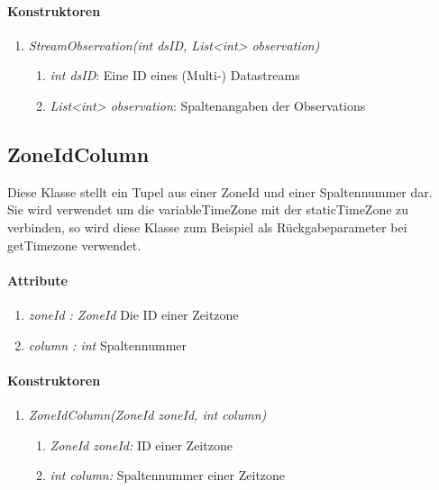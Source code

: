 \paragraph{Konstruktoren}
\begin{enumerate}[+]
	\item \textit{StreamObservation(int dsID, List<int> observation)} \\
	
	\begin{enumerate}[$\bullet$]
		\item \textit{int dsID}: Eine ID eines (Multi-) Datastreams
		\item \textit{List<int> observation}: Spaltenangaben der Observations 
	\end{enumerate}
\end{enumerate}






\subsection*{ZoneIdColumn}\label{zoneCol}
Diese Klasse stellt ein Tupel aus einer ZoneId und einer Spaltennummer dar.\\
Sie wird verwendet um die variableTimeZone mit der staticTimeZone zu verbinden, so wird diese Klasse zum Beispiel als Rückgabeparameter bei getTimezone verwendet.

\paragraph{Attribute}
\begin{enumerate}[-]
	\item \textit{zoneId : ZoneId} Die ID einer Zeitzone
	\item \textit{column : int} Spaltennummer
\end{enumerate}

\paragraph{Konstruktoren}
\begin{enumerate}[+]
	\item \textit{ZoneIdColumn(ZoneId zoneId, int column)} \\
	
	\begin{enumerate}[$\bullet$]
		\item \textit{ZoneId zoneId:} ID einer Zeitzone
		\item \textit{int column:} Spaltennummer einer Zeitzone
	\end{enumerate}
\end{enumerate}












